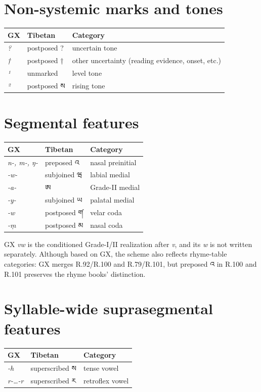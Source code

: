 \documentclass[12pt]{nextart}
\begin{document}
\section{Non-systemic marks and tones}
\begin{center}
\small
\renewcommand{\arraystretch}{1.12}
\setlength{\tabcolsep}{6pt}
\begin{tabular}{lll}
\toprule
\textbf{GX} & \textbf{Tibetan} & \textbf{Category} \\
\midrule
\emph{?} & postposed ? & uncertain tone \\
\emph{†} & postposed † & other uncertainty (reading evidence, onset, etc.) \\
\emph{¹} & unmarked & level tone \\
\emph{²} & postposed ས & rising tone \\
\bottomrule
\end{tabular}
\end{center}

\section{Segmental features}
\begin{center}
\small
\renewcommand{\arraystretch}{1.12}
\setlength{\tabcolsep}{6pt}
\begin{tabular}{lll}
\toprule
\textbf{GX} & \textbf{Tibetan} & \textbf{Category} \\
\midrule
\emph{n-, m-, ŋ-} & preposed འ & nasal preinitial \\
\emph{-w-} & subjoined ཝ & labial medial \\
\emph{-a-} & ཨ & Grade-II medial \\
\emph{-y-} & subjoined ཡ & palatal medial \\
\emph{-w} & postposed ག༹ & velar coda \\
\emph{-ṃ} & postposed མ & nasal coda \\
\bottomrule
\end{tabular}
\end{center}

GX \emph{vw} is the conditioned Grade-I/II realization after \emph{v}, and its \emph{w} is not written separately. Although based on GX, the scheme also reflects rhyme-table categories: GX merges R.92/R.100 and R.79/R.101, but preposed འ in R.100 and R.101 preserves the rhyme books' distinction.

\section{Syllable-wide suprasegmental features}
\begin{center}
\small
\renewcommand{\arraystretch}{1.12}
\setlength{\tabcolsep}{6pt}
\begin{tabular}{lll}
\toprule
\textbf{GX} & \textbf{Tibetan} & \textbf{Category} \\
\midrule
\emph{-h} & superscribed ས  & tense vowel \\
\emph{r-\ldots-r} & superscribed ར & retroflex vowel \\
\bottomrule
\end{tabular}
\end{center}
\end{document}
